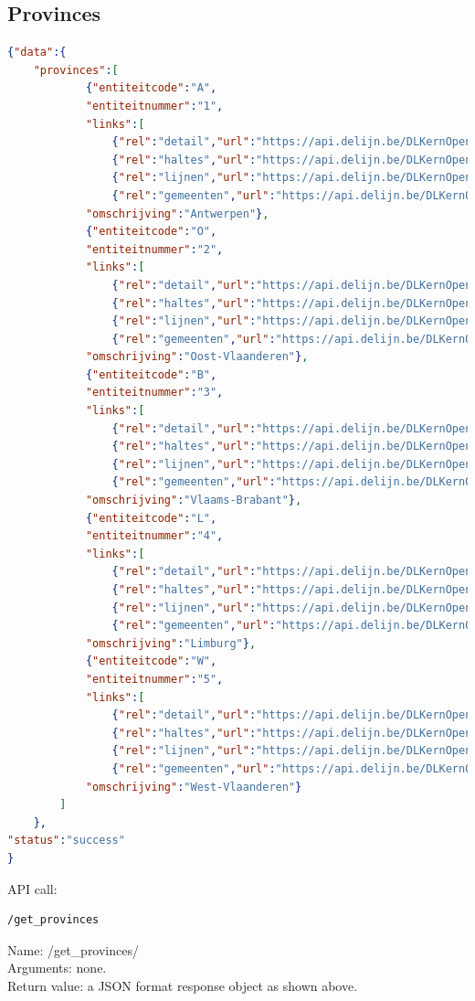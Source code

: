 \documentclass[12pt]{article}
\begin{document}
\subsection{Provinces}
\begin{lstlisting}[language=json]
{"data":{
	"provinces":[
			{"entiteitcode":"A",
			"entiteitnummer":"1",
			"links":[
				{"rel":"detail","url":"https://api.delijn.be/DLKernOpenData/api/v1/entiteiten/1"},
				{"rel":"haltes","url":"https://api.delijn.be/DLKernOpenData/api/v1/entiteiten/1/haltes"},
				{"rel":"lijnen","url":"https://api.delijn.be/DLKernOpenData/api/v1/entiteiten/1/lijnen"},
				{"rel":"gemeenten","url":"https://api.delijn.be/DLKernOpenData/api/v1/entiteiten/1/gemeenten"}],
			"omschrijving":"Antwerpen"},
			{"entiteitcode":"O",
			"entiteitnummer":"2",
			"links":[
				{"rel":"detail","url":"https://api.delijn.be/DLKernOpenData/api/v1/entiteiten/2"},
				{"rel":"haltes","url":"https://api.delijn.be/DLKernOpenData/api/v1/entiteiten/2/haltes"},
				{"rel":"lijnen","url":"https://api.delijn.be/DLKernOpenData/api/v1/entiteiten/2/lijnen"},
				{"rel":"gemeenten","url":"https://api.delijn.be/DLKernOpenData/api/v1/entiteiten/2/gemeenten"}],
			"omschrijving":"Oost-Vlaanderen"},
			{"entiteitcode":"B",
			"entiteitnummer":"3",
			"links":[
				{"rel":"detail","url":"https://api.delijn.be/DLKernOpenData/api/v1/entiteiten/3"},
				{"rel":"haltes","url":"https://api.delijn.be/DLKernOpenData/api/v1/entiteiten/3/haltes"},
				{"rel":"lijnen","url":"https://api.delijn.be/DLKernOpenData/api/v1/entiteiten/3/lijnen"},
				{"rel":"gemeenten","url":"https://api.delijn.be/DLKernOpenData/api/v1/entiteiten/3/gemeenten"}],
			"omschrijving":"Vlaams-Brabant"},
			{"entiteitcode":"L",
			"entiteitnummer":"4",
			"links":[
				{"rel":"detail","url":"https://api.delijn.be/DLKernOpenData/api/v1/entiteiten/4"},
				{"rel":"haltes","url":"https://api.delijn.be/DLKernOpenData/api/v1/entiteiten/4/haltes"},
				{"rel":"lijnen","url":"https://api.delijn.be/DLKernOpenData/api/v1/entiteiten/4/lijnen"},
				{"rel":"gemeenten","url":"https://api.delijn.be/DLKernOpenData/api/v1/entiteiten/4/gemeenten"}],
			"omschrijving":"Limburg"},
			{"entiteitcode":"W",
			"entiteitnummer":"5",
			"links":[
				{"rel":"detail","url":"https://api.delijn.be/DLKernOpenData/api/v1/entiteiten/5"},
				{"rel":"haltes","url":"https://api.delijn.be/DLKernOpenData/api/v1/entiteiten/5/haltes"},
				{"rel":"lijnen","url":"https://api.delijn.be/DLKernOpenData/api/v1/entiteiten/5/lijnen"},
				{"rel":"gemeenten","url":"https://api.delijn.be/DLKernOpenData/api/v1/entiteiten/5/gemeenten"}],
			"omschrijving":"West-Vlaanderen"}
		]
	},
"status":"success"
}
\end{lstlisting}
API call:
\begin{lstlisting}[style=DOS]
/get_provinces
\end{lstlisting}
Name: /get\_provinces/\\
Arguments: none.\\
Return value: a JSON format response object as shown above.
\newpage
\end{document}
